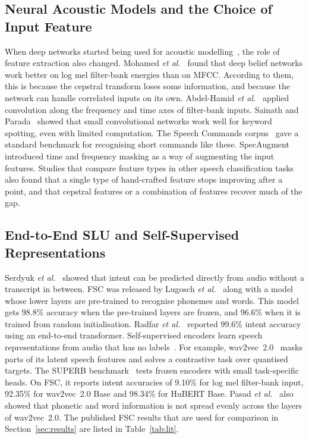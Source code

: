 \documentclass[conference]{IEEEtran}
\begin{document}
\subsection{Neural Acoustic Models and the Choice of Input Feature}
When deep networks started being used for acoustic modelling~\cite{hinton2012dnn}, the role of feature extraction also changed. Mohamed \emph{et al.}~\cite{mohamed2012understanding} found that deep belief networks work better on log mel filter-bank energies than on MFCC. According to them, this is because the cepstral transform loses some information, and because the network can handle correlated inputs on its own. Abdel-Hamid \emph{et al.}~\cite{abdelhamid2014cnn} applied convolution along the frequency and time axes of filter-bank inputs. Sainath and Parada~\cite{sainath2015kws} showed that small convolutional networks work well for keyword spotting, even with limited computation. The Speech Commands corpus~\cite{warden2018speechcommands} gave a standard benchmark for recognising short commands like these. SpecAugment~\cite{park2019specaugment} introduced time and frequency masking as a way of augmenting the input features. Studies that compare feature types in other speech classification tasks~\cite{devi2021meeteilon,nanmalar2025tamil} also found that a single type of hand-crafted feature stops improving after a point, and that cepstral features or a combination of features recover much of the gap.

\subsection{End-to-End SLU and Self-Supervised Representations}
Serdyuk \emph{et al.}~\cite{serdyuk2018e2eslu} showed that intent can be predicted directly from audio without a transcript in between. FSC was released by Lugosch \emph{et al.}~\cite{lugosch2019fsc} along with a model whose lower layers are pre-trained to recognise phonemes and words. This model gets 98.8\% accuracy when the pre-trained layers are frozen, and 96.6\% when it is trained from random initialisation. Radfar \emph{et al.}~\cite{radfar2020transformer} reported 99.6\% intent accuracy using an end-to-end transformer. Self-supervised encoders learn speech representations from audio that has no labels~\cite{schneider2019wav2vec,baevski2020wav2vec2,hsu2021hubert}. For example, wav2vec~2.0~\cite{baevski2020wav2vec2} masks parts of its latent speech features and solves a contrastive task over quantised targets. The SUPERB benchmark~\cite{yang2021superb} tests frozen encoders with small task-specific heads. On FSC, it reports intent accuracies of 9.10\% for log mel filter-bank input, 92.35\% for wav2vec~2.0 Base and 98.34\% for HuBERT Base. Pasad \emph{et al.}~\cite{pasad2021layerwise} also showed that phonetic and word information is not spread evenly across the layers of wav2vec~2.0. The published FSC results that are used for comparison in Section~\ref{sec:results} are listed in Table~\ref{tab:lit}.
\end{document}
